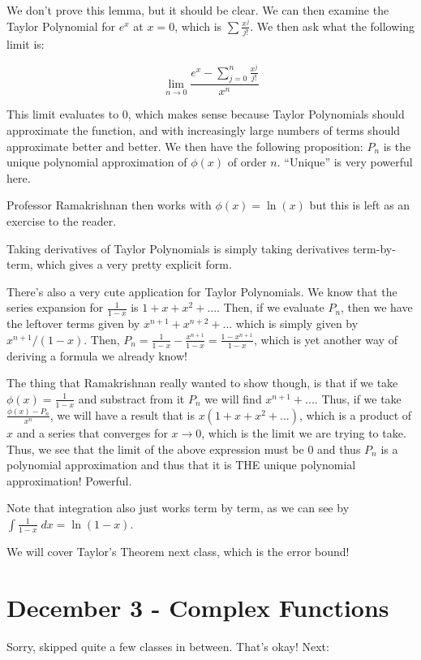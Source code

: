 \documentclass{report}
\begin{document}
We don't prove this lemma, but it should be clear. We can then examine the Taylor Polynomial for $e^x$ at $x =0$, which is $\sum{\frac{x^j}{j!}}$. We then ask what the following limit is:

$$\lim_{n\to 0}\frac{e^x - \displaystyle\sum\limits_{j=0}^n{\frac{x^j}{j!}}}{x^n}$$

This limit evaluates to $0$, which makes sense because Taylor Polynomials should approximate the function, and with increasingly large numbers of terms should approximate better and better. We then have the following proposition: $P_n$ is the unique polynomial approximation of $\phi(x)$ of order $n$. ``Unique'' is very powerful here.

Professor Ramakrishnan then works with $\phi(x) = \ln(x)$ but this is left as an exercise to the reader.

Taking derivatives of Taylor Polynomials is simply taking derivatives term-by-term, which gives a very pretty explicit form. 

There's also a very cute application for Taylor Polynomials. We know that the series expansion for $\frac{1}{1-x}$ is $1 + x + x^2 +...$. Then, if we evaluate $P_n$, then we have the leftover terms given by $x^{n+1} + x^{n+2}+...$ which is simply given by $x^{n+1}/(1-x)$. Then, $P_n = \frac{1}{1-x} - \frac{x^{n+1}}{1-x} = \frac{1-x^{n+1}}{1-x}$, which is yet another way of deriving a formula we already know!

The thing that Ramakrishnan really wanted to show though, is that if we take $\phi(x) = \frac{1}{1-x}$ and substract from it $P_n$ we will find $x^{n+1} +...$. Thus, if we take $\frac{\phi(x) - P_n}{x^n}$, we will have a result that is $x(1+x+x^2+...)$, which is a product of $x$ and a series that converges for $x \to 0$, which is the limit we are trying to take. Thus, we see that the limit of the above expression must be $0$ and thus $P_n$ is a polynomial approximation and thus that it is THE unique polynomial approximation! Powerful.

Note that integration also just works term by term, as we can see by $\int{\frac{1}{1-x}\;dx} = \ln(1-x)$. 

We will cover Taylor's Theorem next class, which is the error bound! 

\section{December 3 - Complex Functions}

Sorry, skipped quite a few classes in between. That's okay! Next:
\end{document}
